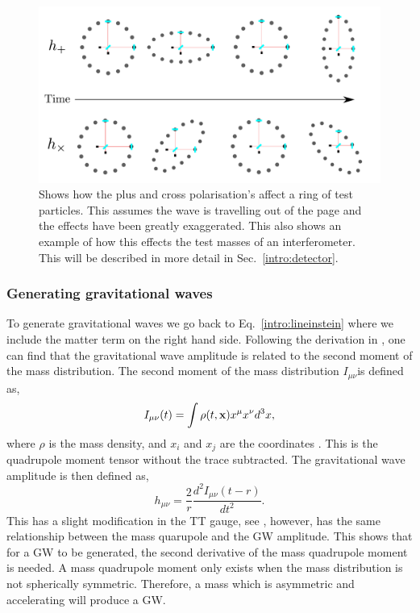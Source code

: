 \begin{figure}[h]
    \centering
    \includegraphics[width=\textwidth]{C1_Introduction/polarisation_ring.pdf}
    \caption{Shows how the plus and cross polarisation's affect a ring of test particles. This assumes the wave is travelling out of the page and the effects have been greatly exaggerated. This also shows an example of how this effects the test masses of an interferometer. This will be described in more detail in Sec.~\ref{intro:detector}.}
    \label{gw:polarisations}
\end{figure}



\subsubsection{Generating gravitational waves}

To generate gravitational waves we go back to Eq.~\ref{intro:lineinstein} where we include the matter term on the right hand side.
Following the derivation in \citep{Flanagan2005TheTheory}, one can find that the gravitational wave amplitude is related to the second moment of the mass distribution.
The second moment of the mass distribution $I_{\mu\nu}$is defined as,
\begin{equation}
    I_{\mu \nu}(t) = \int \rho(t,{\bf x}) x^\mu x^\nu d^3x,
\end{equation}
where $\rho$ is the mass density, and $x_i$ and $x_j$ are the coordinates \citep{Flanagan2005TheTheory}. 
This is the quadrupole moment tensor without the trace subtracted.
The gravitational wave amplitude is then defined as,
\begin{equation}
\label{intro:gwamp}
    h_{\mu \nu} = \frac{2}{r}  \frac{d^2 I_{\mu \nu}(t-r)}{dt^2}.
\end{equation}
This has a slight modification in the TT gauge, see \citep{Flanagan2005TheTheory}, however, has the same relationship between the mass quarupole and the \ac{GW} amplitude.
This shows that for a \ac{GW} to be generated, the second derivative of the mass quadrupole moment is needed.
A mass quadrupole moment only exists when the mass distribution is not spherically symmetric.
Therefore, a mass which is asymmetric and accelerating will produce a \ac{GW}.


